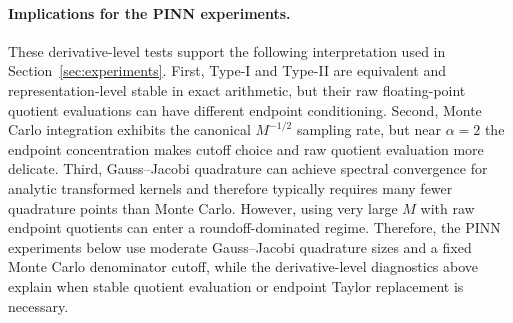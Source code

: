 \paragraph*{Implications for the PINN experiments.}
These derivative-level tests support the following interpretation used in Section~\ref{sec:experiments}.  First, Type-I and Type-II are equivalent and representation-level stable in exact arithmetic, but their raw floating-point quotient evaluations can have different endpoint conditioning.  Second, Monte Carlo integration exhibits the canonical $M^{-1/2}$ sampling rate, but near $\alpha=2$ the endpoint concentration makes cutoff choice and raw quotient evaluation more delicate.  Third, Gauss--Jacobi quadrature can achieve spectral convergence for analytic transformed kernels and therefore typically requires many fewer quadrature points than Monte Carlo.  However, using very large $M$ with raw endpoint quotients can enter a roundoff-dominated regime.  Therefore, the PINN experiments below use moderate Gauss--Jacobi quadrature sizes and a fixed Monte Carlo denominator cutoff, while the derivative-level diagnostics above explain when stable quotient evaluation or endpoint Taylor replacement is necessary.
